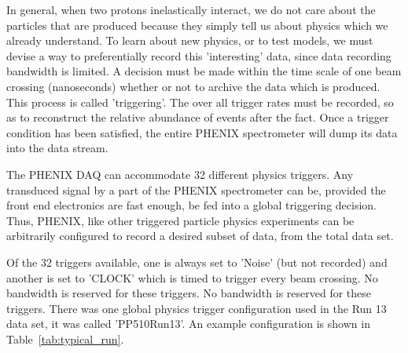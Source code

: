 In general, when two protons inelastically interact, we do not care about the
particles that are produced because they simply tell us about physics which we
already understand. To learn about new physics, or to test models, we must
devise a way to preferentially record this 'interesting'  data, since data
recording bandwidth is limited. A decision must be made within the time scale of
one beam crossing (nanoseconds) whether or not to archive the data which is
produced. This process is called 'triggering'. The over all trigger rates must
be recorded, so as to reconstruct the relative abundance of events after the
fact. Once a trigger condition has been satisfied, the entire PHENIX
spectrometer will dump its data into the data stream.

The PHENIX DAQ can accommodate 32 different physics triggers. Any transduced
signal by a part of the PHENIX spectrometer can be, provided the front end
electronics are fast enough, be fed into a global triggering decision. Thus,
PHENIX, like other triggered particle physics experiments can be arbitrarily
configured to record a desired subset of data, from the total data set.

Of the 32 triggers available, one is always set to 'Noise' (but not recorded)
and another is set to 'CLOCK' which is timed to trigger every beam crossing. No
bandwidth is reserved for these triggers. No bandwidth is reserved for these
triggers. There was one global physics trigger configuration used in the Run 13
data set, it was called 'PP510Run13'. An example configuration is shown in
Table~\ref{tab:typical_run}.

